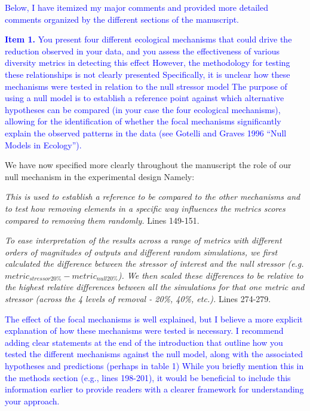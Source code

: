 \documentclass[
]{article}
\begin{document}
\textcolor{blue}{Below, I have itemized my major comments and provided more detailed comments organized by the different sections of the manuscript.}

\textcolor{blue}{\textbf{Item 1.}}
\textcolor{blue}{You present four different ecological mechanisms that could drive the reduction observed in your data, and you assess the effectiveness of various diversity metrics in detecting this effect
However, the methodology for testing these relationships is not clearly presented
Specifically, it is unclear how these mechanisms were tested in relation to the null stressor model
The purpose of using a null model is to establish a reference point against which alternative hypotheses can be compared (in your case the four ecological mechanisms), allowing for the identification of whether the focal mechanisms significantly explain the observed patterns in the data (see Gotelli and Graves 1996 ``Null Models in Ecology'').}

We have now specified more clearly throughout the manuscript the role of our null mechanism in the experimental design
Namely:

\textit{This is used to establish a reference to be compared to the other mechanisms and to test how removing elements in a specific way influences the metrics scores compared to removing them randomly.}
Lines 149-151.

\textit{To ease interpretation of the results across a range of metrics with different orders of magnitudes of outputs and different random simulations, we first calculated the difference between the stressor of interest and the null stressor (e.g. $metric_{stressor20\%} - metric_{null20\%}$).
We then scaled these differences to be relative to the highest relative differences between all the simulations for that one metric and stressor (across the 4 levels of removal - 20\%, 40\%, etc.).}
Lines 274-279.

\textcolor{blue}{The effect of the focal mechanisms is well explained, but I believe a more explicit explanation of how these mechanisms were tested is necessary.
I recommend adding clear statements at the end of the introduction that outline how you tested the different mechanisms against the null model, along with the associated hypotheses and predictions (perhaps in table 1)
While you briefly mention this in the methods section (e.g., lines 198-201), it would be beneficial to include this information earlier to provide readers with a clearer framework for understanding your approach.}
\end{document}
